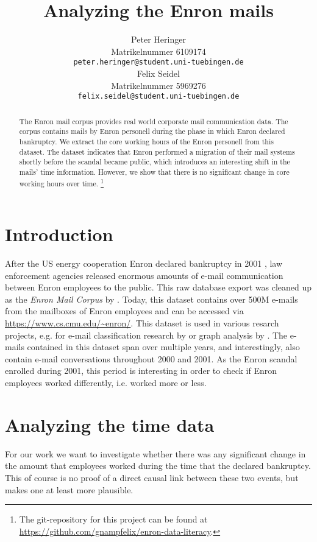 \documentclass{article}
\title{Analyzing the Enron mails}
\author{%
  Peter Heringer\\
  Matrikelnummer 6109174 \\
  \texttt{peter.heringer@student.uni-tuebingen.de} \\
  \And Felix Seidel\\
  Matrikelnummer 5969276 \\
  \texttt{felix.seidel@student.uni-tuebingen.de} \\
}
\begin{document}
\maketitle

\begin{abstract}
  The Enron mail corpus provides real world corporate mail communication data.
  The corpus contains mails by Enron personell during the phase in which Enron
  declared bankruptcy. We extract the core working hours of the Enron personell
  from this dataset. The dataset indicates that Enron performed a migration of
  their mail systems shortly before the scandal became public, which introduces
  an interesting shift in the mails' time information. However, we show that
  there is no significant change in core working hours over time. \footnote{The
  git-repository for this project can be found at
  \url{https://github.com/gnampfelix/enron-data-literacy}.} 
\end{abstract}

\section{Introduction}
After the US energy cooperation Enron declared bankruptcy in 2001
\citep{10.1257/089533003765888403}, law enforcement agencies released enormous
amounts of e-mail communication between Enron employees to the public. This raw
database export was cleaned up as the \emph{Enron Mail Corpus} by
\citet{Klimt2004IntroducingTE}. Today, this dataset contains over 500M e-mails
from the mailboxes of Enron employees and can be accessed via
\url{https://www.cs.cmu.edu/~enron/}. This dataset is used in various resarch
projects, e.g. for e-mail classification research by
\citet{10.1007/978-3-540-30115-8_22} or graph analysis by
\citet{Chapanond_2005}. The e-mails contained in this dataset span over multiple
years, and interestingly, also contain e-mail conversations throughout 2000 and
2001. As the Enron scandal enrolled during 2001, this period is interesting in
order to check if Enron employees worked differently, i.e. worked more or less.

\section{Analyzing the time data}
For our work we want to investigate whether there was any significant change in
the amount that employees worked during the time that the declared bankruptcy.
This of course is no proof of a direct causal link between these two events, but
makes one at least more plausible.
\end{document}
